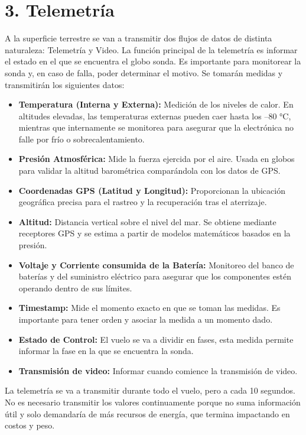 \documentclass[12pt,a4paper]{article}
\begin{document}
\section{\texorpdfstring{\textbf{3. Telemetría}}{3. Telemetría}}\label{telemetruxeda}

A la superficie terrestre se van a transmitir dos flujos de datos de distinta naturaleza: Telemetría y Video. La función principal de la telemetría es informar el estado en el que se encuentra el globo sonda. Es importante para monitorear la sonda y, en caso de falla, poder determinar el motivo. Se tomarán medidas y transmitirán los siguientes datos:

\begin{itemize}
\item
  \textbf{Temperatura (Interna y Externa):} Medición de los niveles de calor. En altitudes elevadas, las temperaturas externas pueden caer hasta los --80 °C, mientras que internamente se monitorea para asegurar que la electrónica no falle por frío o sobrecalentamiento.
\item
  \textbf{Presión Atmosférica:} Mide la fuerza ejercida por el aire. Usada en globos para validar la altitud barométrica comparándola con los datos de GPS.
\item
  \textbf{Coordenadas GPS (Latitud y Longitud):} Proporcionan la ubicación geográfica precisa para el rastreo y la recuperación tras el aterrizaje.
\item
  \textbf{Altitud:} Distancia vertical sobre el nivel del mar. Se obtiene mediante receptores GPS y se estima a partir de modelos matemáticos basados en la presión.
\item
  \textbf{Voltaje y Corriente consumida de la Batería:} Monitoreo del banco de baterías y del suministro eléctrico para asegurar que los componentes estén operando dentro de sus límites.
\item
  \textbf{Timestamp:} Mide el momento exacto en que se toman las medidas. Es importante para tener orden y asociar la medida a un momento dado.
\item
  \textbf{Estado de Control:} El vuelo se va a dividir en fases, esta medida permite informar la fase en la que se encuentra la sonda.
\item
  \textbf{Transmisión de video:} Informar cuando comience la transmisión de video.
\end{itemize}

La telemetría se va a transmitir durante todo el vuelo, pero a cada 10 segundos. No es necesario transmitir los valores continuamente porque no suma información útil y solo demandaría de más recursos de energía, que termina impactando en costos y peso.
\end{document}

